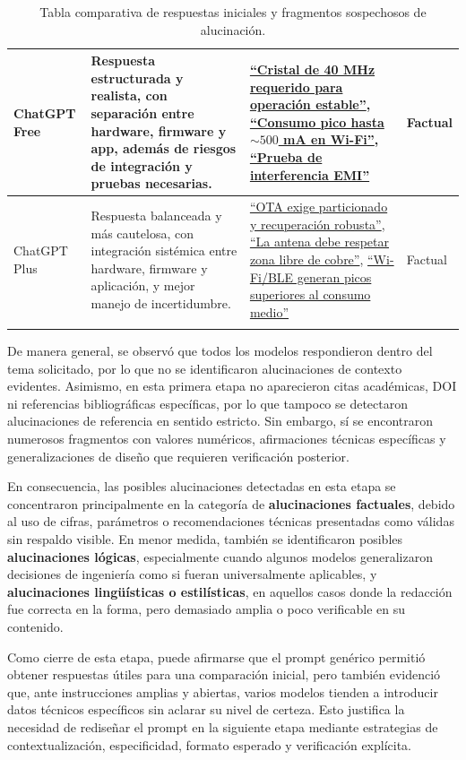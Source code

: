 \documentclass[11pt,a4paper]{article}
\begin{document}
\begin{longtable}{|P{1.9cm}|P{4.4cm}|P{5.2cm}|P{2.2cm}|}
ChatGPT Free &
Respuesta estructurada y realista, con separación entre hardware, firmware y app, además de riesgos de integración y pruebas necesarias. &
\uline{``Cristal de 40 MHz requerido para operación estable''}, \uline{``Consumo pico hasta $\sim 500$ mA en Wi-Fi''}, \uline{``Prueba de interferencia EMI''} &
Factual \\
\hline

ChatGPT Plus &
Respuesta balanceada y más cautelosa, con integración sistémica entre hardware, firmware y aplicación, y mejor manejo de incertidumbre. &
\uline{``OTA exige particionado y recuperación robusta''}, \uline{``La antena debe respetar zona libre de cobre''}, \uline{``Wi-Fi/BLE generan picos superiores al consumo medio''} &
Factual \\
\hline

\caption{Tabla comparativa de respuestas iniciales y fragmentos sospechosos de alucinación.} \\
\end{longtable}
\normalsize

De manera general, se observó que todos los modelos respondieron dentro del tema solicitado, por lo que no se identificaron alucinaciones de contexto evidentes. Asimismo, en esta primera etapa no aparecieron citas académicas, DOI ni referencias bibliográficas específicas, por lo que tampoco se detectaron alucinaciones de referencia en sentido estricto. Sin embargo, sí se encontraron numerosos fragmentos con valores numéricos, afirmaciones técnicas específicas y generalizaciones de diseño que requieren verificación posterior.

En consecuencia, las posibles alucinaciones detectadas en esta etapa se concentraron principalmente en la categoría de \textbf{alucinaciones factuales}, debido al uso de cifras, parámetros o recomendaciones técnicas presentadas como válidas sin respaldo visible. En menor medida, también se identificaron posibles \textbf{alucinaciones lógicas}, especialmente cuando algunos modelos generalizaron decisiones de ingeniería como si fueran universalmente aplicables, y \textbf{alucinaciones lingüísticas o estilísticas}, en aquellos casos donde la redacción fue correcta en la forma, pero demasiado amplia o poco verificable en su contenido.

Como cierre de esta etapa, puede afirmarse que el prompt genérico permitió obtener respuestas útiles para una comparación inicial, pero también evidenció que, ante instrucciones amplias y abiertas, varios modelos tienden a introducir datos técnicos específicos sin aclarar su nivel de certeza. Esto justifica la necesidad de rediseñar el prompt en la siguiente etapa mediante estrategias de contextualización, especificidad, formato esperado y verificación explícita.
\end{document}
